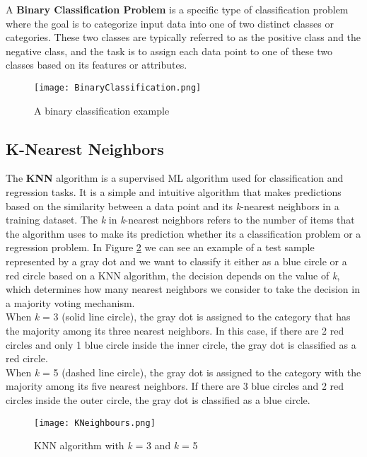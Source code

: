 A \textbf{Binary Classification Problem} is a specific type of classification problem where the goal is to categorize input data into one of two distinct classes or categories. 
These two classes are typically referred to as the positive class and the negative class, and the task is to assign each data point to one of these two classes based on its features or attributes.
\begin{figure}[H]
  \centering
  \texttt{[image: BinaryClassification.png]}
  \caption{A binary classification example}
  \label{fig:bin_classification}
\end{figure}

\subsection{K-Nearest Neighbors}
\label{subsec:KNN}

The \textbf{KNN} algorithm is a supervised ML algorithm used for classification and regression tasks.
It is a simple and intuitive algorithm that makes predictions based on the similarity between a data point and its \textit{k}-nearest neighbors in a training dataset.
The \textit{k} in \textit{k}-nearest neighbors refers to the number of items that the algorithm uses to make its prediction whether its a classification problem or a regression problem.
In Figure \ref{fig:knn} we can see an example of a test sample represented by a gray dot and we want to classify
it either as a blue circle or a red circle based on a KNN algorithm, the decision depends on the value of \textit{k}, which determines how many nearest neighbors we consider to take the decision in a majority voting mechanism.\\
When \textit{k} = 3 (solid line circle), the gray dot is assigned to the category that has the majority among its three nearest neighbors. 
In this case, if there are 2 red circles and only 1 blue circle inside the inner circle, the gray dot is classified as a red circle. \\
When \textit{k} = 5 (dashed line circle), the gray dot is assigned to the category with the majority among its five nearest neighbors. 
If there are 3 blue circles and 2 red circles inside the outer circle, the gray dot is classified as a blue circle.
\begin{figure}[H]
    \centering
    \texttt{[image: KNeighbours.png]}
    \caption{KNN algorithm with \textit{k} = 3 and \textit{k} = 5}
    \label{fig:knn}
\end{figure}

